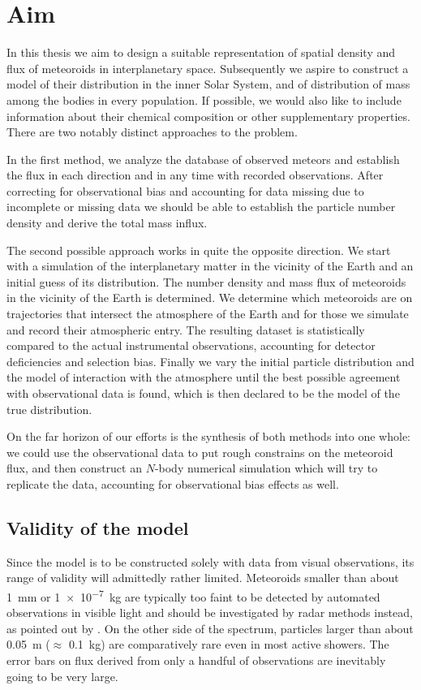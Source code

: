 \section{Aim} \label{ia}
    In this thesis we aim to design a suitable representation of spatial density
    and flux of meteoroids in interplanetary space. Subsequently we aspire to
    construct a model of their distribution in the inner Solar System,
    and of distribution of mass among the bodies in every population.
    If possible, we would also like to include information
    about their chemical composition or other supplementary properties.
    There are two notably distinct approaches to the problem.

    In the first method, we analyze the database of observed meteors and establish
    the flux in each direction and in any time with recorded observations.
    After correcting for observational bias and accounting for data missing due
    to incomplete or missing data we should be able to establish the particle
    number density and derive the total mass influx.

    The second possible approach works in quite the opposite direction. We start with a simulation
    of the interplanetary matter in the vicinity of the Earth and an initial guess of its distribution.
    The number density and mass flux of meteoroids in the vicinity of the Earth is determined.
    We determine which meteoroids are on trajectories that intersect the atmosphere of the Earth
    and for those we simulate and record their atmospheric entry. The resulting dataset is statistically compared
    to the actual instrumental observations, accounting for detector deficiencies and selection bias.
    Finally we vary the initial particle distribution and the model of interaction with the atmosphere
    until the best possible agreement with observational data is found, which is then
    declared to be the model of the true distribution.

    On the far horizon of our efforts is the synthesis of both methods into one whole:
    we could use the observational data to put rough constrains on the meteoroid flux,
    and then construct an $N$-body numerical simulation which will try to replicate the data,
    accounting for observational bias effects as well.

    \subsection{Validity of the model} \label{iav}
        Since the model is to be constructed solely with data from visual observations,
        its range of validity will admittedly rather limited.
        Meteoroids smaller than about \SI{1}{\milli\metre} or \SI{1e-7}{\kilo\gram} are typically too faint
        to be detected by automated observations in visible light and should be investigated
        by radar methods instead, as pointed out by \citep{???}.
        On the other side of the spectrum, particles larger than about \SI{0.05}{\metre} ($\approx$ \SI{0.1}{\kilo\gram})
        are comparatively rare even in most active showers.
        The error bars on flux derived from only a handful of observations are inevitably going to be very large.

